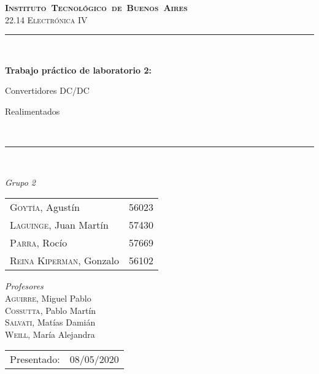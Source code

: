 
\begin{titlepage}
\newcommand{\HRule}{\rule{\linewidth}{0.5mm}}
\center
\mbox{\textsc{\LARGE \bfseries {Instituto Tecnol\'ogico de Buenos Aires}}}\\[1.5cm]
\textsc{\Large 22.14 Electr\'onica IV}\\[0.5cm]


\HRule \\[0.6cm]
{ \Huge \bfseries Trabajo pr\'actico de laboratorio  2: 

 Convertidores DC/DC

\vspace{0.2cm} 
 Realimentados}\\[0.4cm] %
\HRule \\[1.5cm]


{\large

\emph{Grupo 2}\\
\vspace{3px}

\begin{tabular}{lr} 	
\textsc{Goyt\'ia}, Agust\'in  & 56023 \\
\textsc{Laguinge}, Juan Mart\'in  & 57430 \\
\textsc{Parra}, Roc\'io  & 57669 \\
\textsc{Reina Kiperman}, Gonzalo  & 56102 \\
\end{tabular}

\vspace{20px}

\emph{Profesores}\\
\vspace{3px}
\textsc{Aguirre}, Miguel Pablo\\ 
\textsc{Cossutta}, Pablo Mart\'in\\ 
\textsc{Salvati}, Mat\'ias Dami\'an\\	
\textsc{Weill}, Mar\'ia Alejandra\\ 	

\vspace{100px}

\begin{tabular}{ll}

Presentado: & 08/05/2020\\


\end{tabular}

}

\vfill

\end{titlepage}